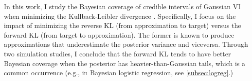 In this work, I study the Bayesian coverage of
credible intervals of Gaussian VI when minimizing
the Kullback-Leibler divergence \citep[KL][]{kl}.
Specifically, I focus on the impact of minimizing the reverse KL
(from approximation to target) versus the forward KL (from target to approximation).
The former is known to produce approximations that underestimate
the posterior variance and viceversa.
Through two simulation studies,
I conclude that the forward KL tends to have better Bayesian coverage
when the posterior has heavier-than-Gaussian tails,
which is a common occurrence
(e.g., in Bayesian logistic regression, see \cref{subsec:logreg}.)
